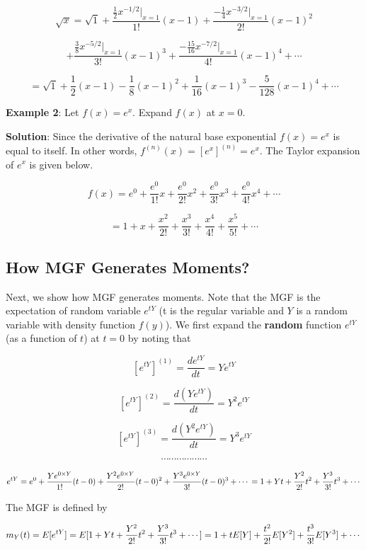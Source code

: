 \documentclass[
]{book}
\begin{document}
\[
\sqrt{x} = \sqrt{1} + \frac{\frac{1}{2}x^{-1/2}|_{x=1}}{1!}(x-1) + \frac{-\frac{1}{4}x^{-3/2}|_{x=1}}{2!}(x-1)^2 
\]

\[
+ \frac{\frac{3}{8}x^{-5/2}|_{x=1}}{3!}(x-1)^3 + \frac{-\frac{15}{16}x^{-7/2}|_{x=1}}{4!}(x-1)^4 + \cdots 
\]

\[
=\sqrt{1} +\frac{1}{2}(x-1) - \frac{1}{8}(x-1)^2 + \frac{1}{16}(x-1)^3 - \frac{5}{128}(x-1)^4 +\cdots
\]

\textbf{Example 2}: Let \(f(x) = e^x\). Expand \(f(x)\) at \(x = 0\).

\textbf{Solution}: Since the derivative of the natural base exponential \(f(x) = e^x\) is equal to itself. In other words, \(f^{(n)}(x) = [e^x]^{(n)} = e^x\). The Taylor expansion of \(e^x\) is given below.

\[
f(x) = e^0 + \frac{e^0}{1!}x + \frac{e^0}{2!}x^2+\frac{e^0}{3!}x^3 + \frac{e^0}{4!}x^4 + \cdots
\]

\[
= 1 + x + \frac{x^2}{2!} + \frac{x^3}{3!} + \frac{x^4}{4!} + \frac{x^5}{5!}  +\cdots
\]

\hypertarget{how-mgf-generates-moments}{%
\subsection{How MGF Generates Moments?}\label{how-mgf-generates-moments}}

Next, we show how MGF generates moments. Note that the MGF is the expectation of random variable \(e^{tY}\) (t is the regular variable and \(Y\) is a random variable with density function \(f(y)\)). We first expand the \textbf{random} function \(e^{tY}\) (as a function of \(t\)) at \(t = 0\) by noting that

\[
[e^{tY}]^{(1)} = \frac{d e^{tY}}{dt} = Ye^{tY} 
\]

\[
[e^{tY}]^{(2)}  = \frac{d (Ye^{tY})}{dt} = Y^2e^{tY}
\]

\[
[e^{tY}]^{(3)}  = \frac{d (Y^2e^{tY})}{dt} = Y^3e^{tY} 
\]

\[
\cdots \cdots \cdots \cdots \cdots \cdots
\]

\[
e^{tY} = e^0 + \frac{Ye^{0\times Y}}{1!}(t-0) + \frac{Y^2e^{0\times Y}}{2!}(t-0)^2 + \frac{Y^3e^{0\times Y}}{3!}(t-0)^3 + \cdots \\ = 1 + Yt + \frac{Y^2}{2!}t^2 + \frac{Y^3}{3!}t^3 + \cdots
\]

The MGF is defined by

\[
m_Y(t) = E[e^{tY}]=E[1 + Yt + \frac{Y^2}{2!}t^2 + \frac{Y^3}{3!}t^3 + \cdots] \\ = 1 + tE[Y] + \frac{t^2}{2!}E[Y^2] + \frac{t^3}{3!}E[Y^3] + \cdots
\]
\end{document}

